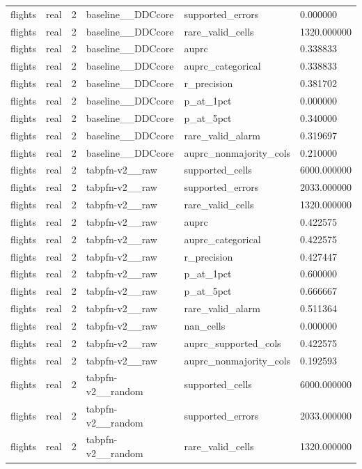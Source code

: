 \begin{tabular}{llllll}
flights & real & 2 & baseline\_\_DDCcore & supported\_errors & 0.000000 \\
flights & real & 2 & baseline\_\_DDCcore & rare\_valid\_cells & 1320.000000 \\
flights & real & 2 & baseline\_\_DDCcore & auprc & 0.338833 \\
flights & real & 2 & baseline\_\_DDCcore & auprc\_categorical & 0.338833 \\
flights & real & 2 & baseline\_\_DDCcore & r\_precision & 0.381702 \\
flights & real & 2 & baseline\_\_DDCcore & p\_at\_1pct & 0.000000 \\
flights & real & 2 & baseline\_\_DDCcore & p\_at\_5pct & 0.340000 \\
flights & real & 2 & baseline\_\_DDCcore & rare\_valid\_alarm & 0.319697 \\
flights & real & 2 & baseline\_\_DDCcore & auprc\_nonmajority\_cols & 0.210000 \\
flights & real & 2 & tabpfn-v2\_\_raw & supported\_cells & 6000.000000 \\
flights & real & 2 & tabpfn-v2\_\_raw & supported\_errors & 2033.000000 \\
flights & real & 2 & tabpfn-v2\_\_raw & rare\_valid\_cells & 1320.000000 \\
flights & real & 2 & tabpfn-v2\_\_raw & auprc & 0.422575 \\
flights & real & 2 & tabpfn-v2\_\_raw & auprc\_categorical & 0.422575 \\
flights & real & 2 & tabpfn-v2\_\_raw & r\_precision & 0.427447 \\
flights & real & 2 & tabpfn-v2\_\_raw & p\_at\_1pct & 0.600000 \\
flights & real & 2 & tabpfn-v2\_\_raw & p\_at\_5pct & 0.666667 \\
flights & real & 2 & tabpfn-v2\_\_raw & rare\_valid\_alarm & 0.511364 \\
flights & real & 2 & tabpfn-v2\_\_raw & nan\_cells & 0.000000 \\
flights & real & 2 & tabpfn-v2\_\_raw & auprc\_supported\_cols & 0.422575 \\
flights & real & 2 & tabpfn-v2\_\_raw & auprc\_nonmajority\_cols & 0.192593 \\
flights & real & 2 & tabpfn-v2\_\_random & supported\_cells & 6000.000000 \\
flights & real & 2 & tabpfn-v2\_\_random & supported\_errors & 2033.000000 \\
flights & real & 2 & tabpfn-v2\_\_random & rare\_valid\_cells & 1320.000000 \\

\end{tabular}
